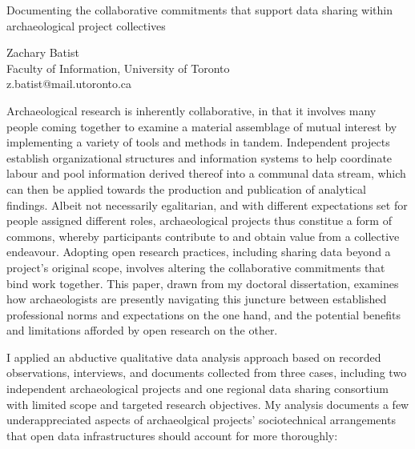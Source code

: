 \documentclass[a4paper]{article}
\begin{document}

\large
\begin{center}
Documenting the collaborative commitments that support data sharing within archaeological project collectives

\large
Zachary Batist\\

\small  
Faculty of Information, University of Toronto\\
z.batist@mail.utoronto.ca\\

\end{center}

\normalsize

Archaeological research is inherently collaborative, in that it involves many people coming together to examine a material assemblage of mutual interest by implementing a variety of tools and methods in tandem. Independent projects establish organizational structures and information systems to help coordinate labour and pool information derived thereof into a communal data stream, which can then be applied towards the production and publication of analytical findings. Albeit not necessarily egalitarian, and with different expectations set for people assigned different roles, archaeological projects thus constitue a form of commons, whereby participants contribute to and obtain value from a collective endeavour. Adopting open research practices, including sharing data beyond a project's original scope, involves altering the collaborative commitments that bind work together. This paper, drawn from my doctoral dissertation, examines how archaeologists are presently navigating this juncture between established professional norms and expectations on the one hand, and the potential benefits and limitations afforded by open research on the other.

I applied an abductive qualitative data analysis approach based on recorded observations, interviews, and documents collected from three cases, including two independent archaeological projects and one regional data sharing consortium with limited scope and targeted research objectives. My analysis documents a few underappreciated aspects of archaeolgical projects' sociotechnical arrangements that open data infrastructures should account for more thoroughly:
\end{document}
